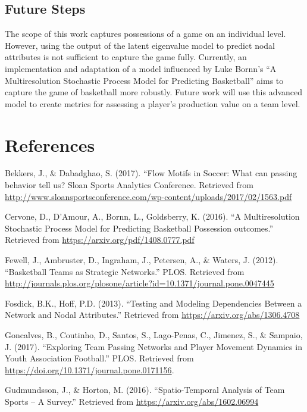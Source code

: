\documentclass[12pt,twoside]{dukestatscithesis}
\theoremstyle{definition}
\theoremstyle{definition}
\theoremstyle{definition}
\theoremstyle{remark}
\begin{document}
\section{Future Steps}\label{future-steps}

The scope of this work captures possessions of a game on an individual
level. However, using the output of the latent eigenvalue model to
predict nodal attributes is not sufficient to capture the game fully.
Currently, an implementation and adaptation of a model influenced by
Luke Bornn's ``A Multiresolution Stochastic Process Model for Predicting
Basketball'' aims to capture the game of basketball more robustly.
Future work will use this advanced model to create metrics for assessing
a player's production value on a team level.

\backmatter

\chapter*{References}\label{references}

Bekkers, J., \& Dabadghao, S. (2017). ``Flow Motifs in Soccer: What can
passing behavior tell us? Sloan Sports Analytics Conference. Retrieved
from
\url{http://www.sloansportsconference.com/wp-content/uploads/2017/02/1563.pdf}

Cervone, D., D'Amour, A., Bornn, L., Goldsberry, K. (2016). ``A
Multiresolution Stochastic Process Model for Predicting Basketball
Possession outcomes.'' Retrieved from
\url{https://arxiv.org/pdf/1408.0777.pdf}

Fewell, J., Ambruster, D., Ingraham, J., Petersen, A., \& Waters, J.
(2012). ``Basketball Teams as Strategic Networks.'' PLOS. Retrieved from
\url{http://journals.plos.org/plosone/article?id=10.1371/journal.pone.0047445}

Fosdick, B.K., Hoff, P.D. (2013). ``Testing and Modeling Dependencies
Between a Network and Nodal Attributes.'' Retrieved from
\url{https://arxiv.org/abs/1306.4708}

Goncalves, B., Coutinho, D., Santos, S., Lago-Penas, C., Jimenez, S., \&
Sampaio, J. (2017). ``Exploring Team Passing Networks and Player
Movement Dynamics in Youth Association Football.'' PLOS. Retrieved from
\url{https://doi.org/10.1371/journal.pone.0171156}.

Gudmundsson, J., \& Horton, M. (2016). ``Spatio-Temporal Analysis of
Team Sports -- A Survey.'' Retrieved from
\url{https://arxiv.org/abs/1602.06994}
\end{document}
